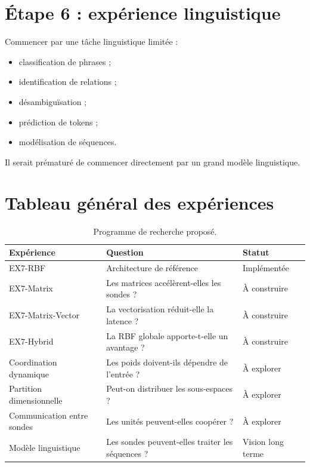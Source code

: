 \documentclass[11pt,a4paper]{report}
\begin{document}
\section{Étape 6 : expérience linguistique}

Commencer par une tâche linguistique limitée :

\begin{itemize}
  \item classification de phrases ;
  \item identification de relations ;
  \item désambiguïsation ;
  \item prédiction de tokens ;
  \item modélisation de séquences.
\end{itemize}

Il serait prématuré de commencer directement par
un grand modèle linguistique.

\section{Tableau général des expériences}

\begin{table}[H]
\centering
\small
\begin{tabularx}{\textwidth}{
  >{\raggedright\arraybackslash}p{3.0cm}
  X
  >{\raggedright\arraybackslash}p{2.1cm}
}
\toprule
Expérience & Question & Statut\\
\midrule
EX7-RBF
&
Architecture de référence
&
Implémentée\\

EX7-Matrix
&
Les matrices accélèrent-elles les sondes ?
&
À construire\\

EX7-Matrix-Vector
&
La vectorisation réduit-elle la latence ?
&
À construire\\

EX7-Hybrid
&
La RBF globale apporte-t-elle un avantage ?
&
À construire\\

Coordination dynamique
&
Les poids doivent-ils dépendre de l'entrée ?
&
À explorer\\

Partition dimensionnelle
&
Peut-on distribuer les sous-espaces ?
&
À explorer\\

Communication entre sondes
&
Les unités peuvent-elles coopérer ?
&
À explorer\\

Modèle linguistique
&
Les sondes peuvent-elles traiter les séquences ?
&
Vision long terme\\
\bottomrule
\end{tabularx}
\caption{Programme de recherche proposé.}
\end{table}
\end{document}

